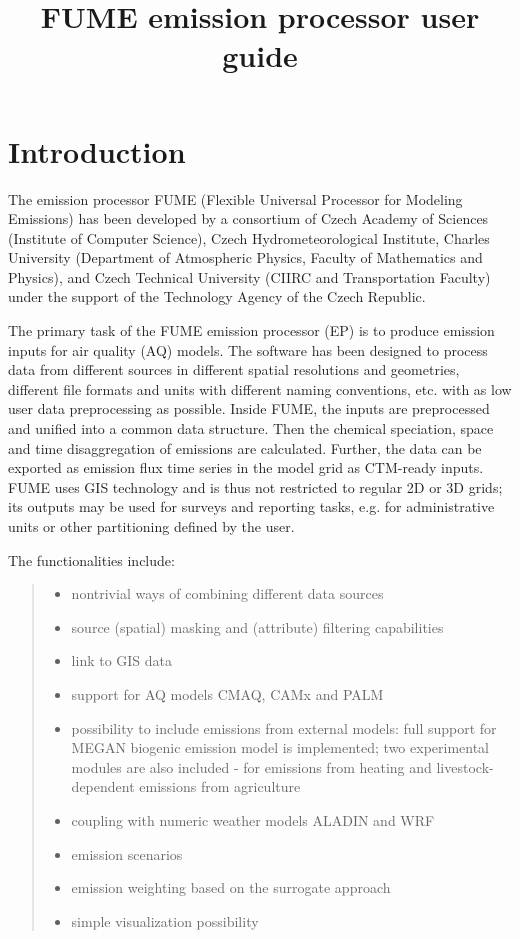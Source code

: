 \documentclass[a4paper,11pt]{article}
\begin{document}
\title{FUME emission processor user guide}
\maketitle

\tableofcontents

\newpage


\section{Introduction}\label{introduction}

The emission processor FUME (Flexible Universal Processor for Modeling Emissions) has been
developed by a consortium of Czech Academy of Sciences (Institute of Computer Science),
Czech Hydrometeorological Institute, Charles University (Department of
Atmospheric Physics, Faculty of Mathematics and Physics),
and Czech Technical University (CIIRC and Transportation Faculty) under the support of the Technology Agency of the Czech Republic.

The primary task of the FUME emission processor (EP) is to produce emission inputs for air quality (AQ) models. The software has been designed to process data from different sources in different spatial resolutions and geometries, different file formats and units with different naming conventions, etc. with as low user data preprocessing as possible. Inside FUME, the inputs are preprocessed and unified into a common data structure. Then the chemical speciation, space and time disaggregation of emissions are calculated. Further, the data can be exported as emission flux time series in the model grid as CTM-ready inputs. 
FUME uses GIS technology and is thus not restricted to regular 2D or 3D grids; its
outputs may be used for surveys and reporting tasks, e.g. for administrative units or other
partitioning defined by the user.

The functionalities include:
\begin{quote}
\begin{itemize}
\item
  nontrivial ways of combining different data sources
\item
  source (spatial) masking and (attribute) filtering capabilities
\item
  link to GIS data
\item
  support for AQ models CMAQ, CAMx and PALM
\item
  possibility to include emissions from external models: full support for MEGAN biogenic emission model is implemented; two experimental modules are also included - for emissions from heating and livestock-dependent emissions from agriculture
\item
  coupling with numeric weather models ALADIN and WRF
\item
  emission scenarios
\item
  emission weighting based on the surrogate approach
\item
  simple visualization possibility
\end{itemize}
\end{quote}
\end{document}
